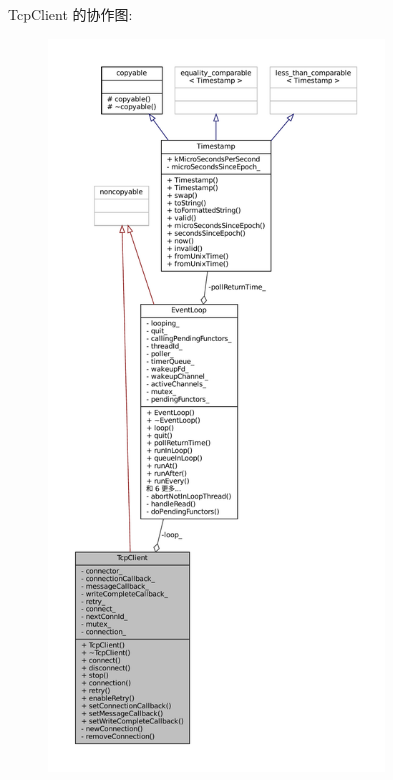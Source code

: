 Tcp\+Client 的协作图\+:
\nopagebreak
\begin{figure}[H]
\begin{center}
\leavevmode
\includegraphics[height=550pt]{classmuduo_1_1TcpClient__coll__graph}
\end{center}
\end{figure}
